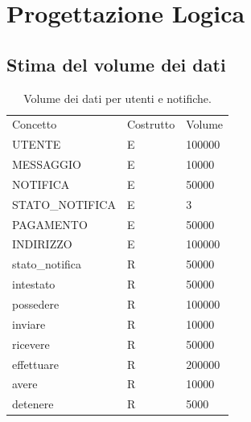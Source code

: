 \documentclass[a4paper,12pt]{report}
\begin{document}
	\chapter{Progettazione Logica}
	\section{Stima del volume dei dati} \label{s:volumes}
	\begin{table}[H]
		\centering
		\begin{tabular}{|lll|}
			\hline
			\rowcolor[HTML]{FFCE93}
			\multicolumn{3}{|l|}{\cellcolor[HTML]{FFCE93}Utenti e Notifiche} \\ \hline
			\rowcolor[HTML]{CBCEFB}
			Concetto            & Costrutto & Volume           \\ \hline
			UTENTE              & E         & 100000           \\ \hline
			MESSAGGIO           & E         & 10000            \\ \hline
			NOTIFICA            & E         & 50000            \\ \hline
			STATO\_NOTIFICA     & E         & 3                \\ \hline
			PAGAMENTO			& E 		& 50000			   \\ \hline
			INDIRIZZO			& E			& 100000		   \\ \hline
			stato\_notifica     & R         & 50000            \\ \hline
			intestato			& R			& 50000			   \\ \hline
			possedere			& R   		& 100000		   \\ \hline
			inviare             & R         & 10000            \\ \hline
			ricevere            & R         & 50000            \\ \hline
			effettuare          & R         & 200000           \\ \hline
			avere          		& R         & 10000            \\ \hline
			detenere            & R         & 5000             \\ \hline
		\end{tabular}
		\caption{Volume dei dati per utenti e notifiche.}
	\end{table}
	
\end{document}
